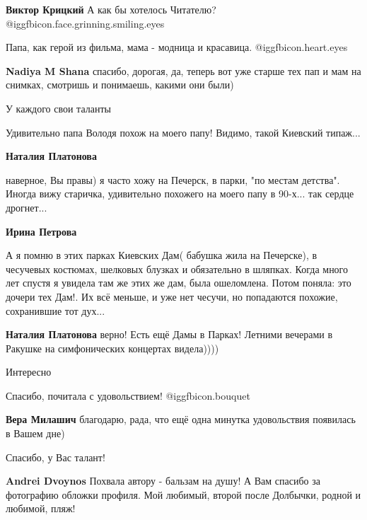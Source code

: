 \begin{itemize}
\begin{itemize}
\textbf{Виктор Крицкий} А как бы хотелось Читателю? @igg{fbicon.face.grinning.smiling.eyes} 
\end{itemize} %


Папа, как герой из фильма, мама - модница и красавица.  @igg{fbicon.heart.eyes} 

\begin{itemize} %
\textbf{Nadiya M Shana} спасибо, дорогая, да, теперь вот уже старше тех пап и мам на снимках, смотришь и понимаешь, какими они были)
\end{itemize} %

У каждого свои таланты

Удивительно папа Володя похож на моего папу! Видимо, такой Киевский типаж...

\begin{itemize} %
\textbf{Наталия Платонова} 

наверное, Вы правы) я часто хожу на Печерск, в парки, "по местам детства".
Иногда вижу старичка, удивительно похожего на моего папу в 90-х... так сердце
дрогнет...

\textbf{Ирина Петрова} 

А я помню в этих парках Киевских Дам( бабушка жила на Печерске), в чесучевых
костюмах, шелковых блузках и обязательно в шляпках. Когда много лет спустя я
увидела там же этих же дам, была ошеломлена. Потом поняла: это дочери тех Дам!.
Их всё меньше, и уже нет чесучи, но попадаются похожие, сохранившие тот дух...

\textbf{Наталия Платонова} верно! Есть ещё Дамы в Парках! Летними вечерами в Ракушке на симфонических концертах видела))))
\end{itemize} %

Интересно

Спасибо, почитала с удовольствием! @igg{fbicon.bouquet} 

\begin{itemize} %
\textbf{Вера Милашич} благодарю, рада, что ещё одна минутка удовольствия появилась в Вашем дне)
\end{itemize} %

Спасибо, у Вас талант!

\begin{itemize} %
\textbf{Andrei Dvoynos} Похвала автору - бальзам на душу! А Вам спасибо за фотографию обложки профиля. Мой любимый, второй после Долбычки, родной и любимой, пляж!
\end{itemize} %


\end{itemize}
